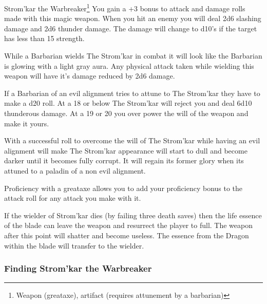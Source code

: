 \begin{commentbox}{Strom'kar the Warbreaker\footnote{Weapon (greataxe), artifact (requires attunement by a barbarian)}}	
	You gain a +3 bonus to attack and damage rolls made with this magic weapon. When you hit an enemy you will deal 2d6 slashing damage and 2d6 thunder damage. The damage will change to d10's if the target has less than 15 strength.
	
	While a Barbarian wields The Strom'kar in combat it will look like the Barbarian is glowing with a light gray aura. Any physical attack taken while wielding this weapon will have it's damage reduced by 2d6 damage.
	
	If a Barbarian of an evil alignment tries to attune to The Strom'kar they have to make a d20 roll. At a 18 or below The Strom'kar will reject you and deal 6d10 thunderous damage. At a 19 or 20 you over power the will of the weapon and make it yours.
	
	With a successful roll to overcome the will of The Strom'kar while having an evil alignment will make The Strom'kar appearance will start to dull and become darker until it becomes fully corrupt. It will regain its former glory when its attuned to a paladin of a non evil alignment.
	
	Proficiency with a greataxe allows you to add your proficiency bonus to the attack roll for any attack you make with it.
	
	If the wielder of Strom'kar dies (by failing three death saves) then the life essence of the blade can leave the weapon and resurrect the player to full. The weapon after this point will shatter and become useless. The essence from the Dragon within the blade will transfer to the wielder.
\end{commentbox}

\subsubsection{Finding Strom'kar the Warbreaker}

